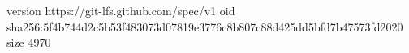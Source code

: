 version https://git-lfs.github.com/spec/v1
oid sha256:5f4b744d2c5b53f483073d07819e3776c8b807c88d425dd5bfd7b47573fd2020
size 4970
